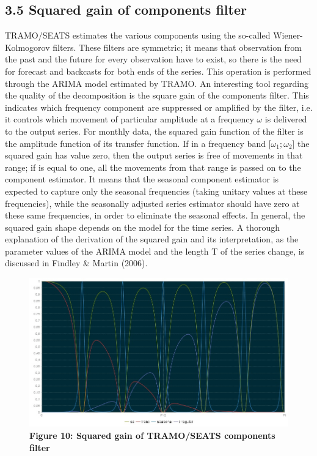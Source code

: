 \documentclass{article}
\begin{document}
\subsection*{\small 3.5 Squared gain of components filter}
TRAMO/SEATS estimates the various components using the so-called Wiener-Kolmogorov filters. These filters are symmetric; it means that observation from the past and the future for every observation have to exist, so there is the need for forecast and backcasts for both ends of the series. This operation is performed through the ARIMA model estimated by TRAMO.  An interesting tool regarding the quality of the decomposition is the square gain of the components filter. This indicates which frequency component are suppressed or amplified by the filter, i.e. it controls which movement of particular amplitude at a frequency $\omega$ is delivered to the output series. For monthly data, the squared gain function of the filter is the amplitude function of its transfer function. If in a frequency band [$\omega_{1};\omega_{2}$] the squared gain has value zero, then the output series is free of movements in that range; if is equal to one, all the movements from that range is passed on to the component estimator. It means that the seasonal component estimator is expected to capture only the seasonal frequencies (taking unitary values at these frequencies), while the seasonally adjusted series estimator should have zero at these same frequencies, in order to eliminate the seasonal effects. In general, the squared gain shape depends on the model for the time series. A thorough explanation of the derivation of the squared gain and its interpretation, as the parameter values of the ARIMA model and the length T of the series change, is discussed in Findley \& Martin (2006).
\begin{figure}[H]
\centering
  \includegraphics[width=\linewidth]{../images/capitolo3/squaredgain.jpg}
  {\textbf{\scriptsize Figure 10: Squared gain of TRAMO/SEATS components filter}}
\end{figure}
\end{document}
